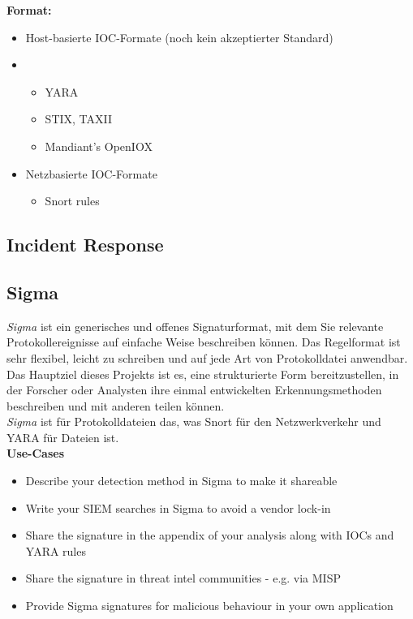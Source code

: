 \textbf{Format:}
\begin{itemize}
    \item Host-basierte IOC-Formate (noch kein akzeptierter Standard)
    \item 
    \begin{itemize}
        \item YARA
        \item STIX, TAXII
        \item Mandiant's OpenIOX
    \end{itemize}

    \item Netzbasierte IOC-Formate
    \begin{itemize}
        \item Snort rules
    \end{itemize}
\end{itemize}

\subsection{Incident Response}

\subsection{Sigma}
\textit{Sigma} ist ein generisches und offenes Signaturformat, mit dem Sie relevante Protokollereignisse auf einfache Weise beschreiben können.
Das Regelformat ist sehr flexibel, leicht zu schreiben und auf jede Art von Protokolldatei anwendbar.
Das Hauptziel dieses Projekts ist es, eine strukturierte Form bereitzustellen, in der Forscher oder Analysten ihre einmal entwickelten Erkennungsmethoden beschreiben und mit anderen teilen können.\\

\textit{Sigma} ist für Protokolldateien das, was Snort für den Netzwerkverkehr und YARA für Dateien ist.\\

\textbf{Use-Cases}
\begin{itemize}
    \item Describe your detection method in Sigma to make it shareable
    \item Write your SIEM searches in Sigma to avoid a vendor lock-in
    \item Share the signature in the appendix of your analysis along with IOCs and YARA rules
    \item Share the signature in threat intel communities - e.g. via MISP
    \item Provide Sigma signatures for malicious behaviour in your own application
\end{itemize}